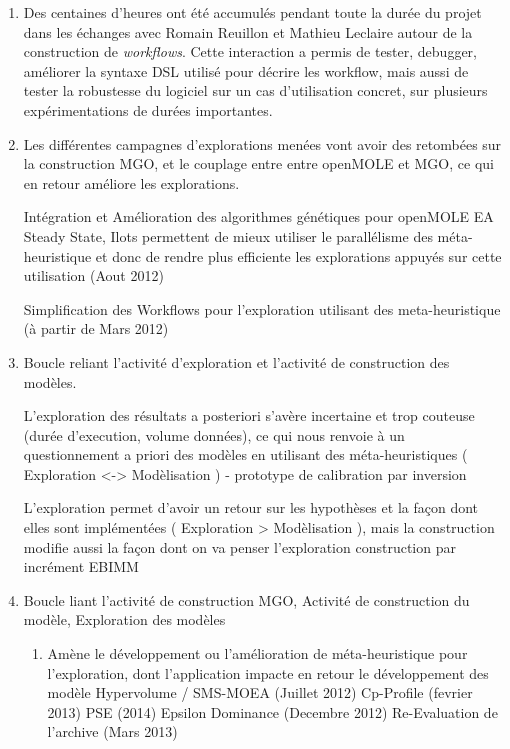 \begin{enumerate}[label={},noitemsep,  parsep=0pt, partopsep=0pt, labelindent=0pt, leftmargin=*]
		
\item {} Des centaines d'heures ont été accumulés pendant toute la durée du projet dans les échanges avec Romain Reuillon et Mathieu Leclaire autour de la construction de \textit{workflows}. Cette interaction a permis de tester, debugger, améliorer la syntaxe DSL utilisé pour décrire les workflow, mais aussi de tester la robustesse du logiciel sur un cas d'utilisation concret, sur plusieurs expérimentations de durées importantes.

\item {} Les différentes campagnes d'explorations menées vont avoir des retombées sur la construction MGO, et le couplage entre entre openMOLE et MGO, ce qui en retour améliore les explorations.

Intégration et Amélioration des algorithmes génétiques pour openMOLE
EA Steady State, Ilots permettent de mieux utiliser le parallélisme des méta-heuristique et donc de rendre plus efficiente les explorations appuyés sur cette utilisation (Aout 2012) 

Simplification des Workflows pour l'exploration utilisant des meta-heuristique (à partir de Mars 2012)

\item {}  Boucle reliant l'activité d'exploration et l'activité de construction des modèles. 

L'exploration des résultats a posteriori s'avère incertaine et trop couteuse (durée d'execution, volume données), ce qui nous renvoie à un questionnement a priori des modèles en utilisant des méta-heuristiques ( Exploration <-> Modèlisation )
- prototype de calibration par inversion 

L'exploration permet d'avoir un retour sur les hypothèses et la façon dont elles sont implémentées ( Exploration > Modèlisation ), mais la construction modifie aussi la façon dont on va penser l'exploration
 construction par incrément EBIMM
		
\item {} Boucle liant l'activité de construction MGO, Activité de construction du modèle, Exploration des modèles

\begin{enumerate}
\item  Amène le développement ou l'amélioration de méta-heuristique pour l'exploration, dont l'application impacte en retour le développement des modèle
 Hypervolume / SMS-MOEA (Juillet 2012)
Cp-Profile (fevrier 2013)
PSE (2014)
Epsilon Dominance (Decembre 2012)
Re-Evaluation de l'archive (Mars 2013)


\end{enumerate}
\end{enumerate}
